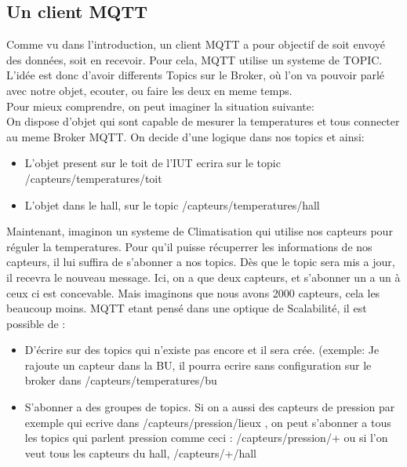 \documentclass[a4paper,10pt]{article}
\begin{document}
\subsection{Un client MQTT}
 Comme vu dans l'introduction, un client MQTT a pour objectif de soit envoyé des données, soit en recevoir. Pour cela, MQTT utilise un systeme de TOPIC. L'idée est donc d'avoir differents Topics sur le Broker, où l'on va pouvoir parlé avec notre objet, ecouter, ou faire les deux en meme temps.\\
 Pour mieux comprendre, on peut imaginer la situation suivante:\\
 On dispose d'objet qui sont capable de mesurer la temperatures et tous connecter au meme Broker MQTT.
 On decide d'une logique dans nos topics et ainsi:
 \begin{itemize}
  \item L'objet present sur le toit de l'IUT ecrira sur le topic /capteurs/temperatures/toit
  \item L'objet dans le hall, sur le topic /capteurs/temperatures/hall
 \end{itemize}
Maintenant, imaginon un systeme de Climatisation qui utilise nos capteurs pour réguler la temperatures. Pour qu'il puisse récuperrer les informations de nos capteurs, il lui suffira de s'abonner a nos topics. Dès que le topic sera mis a jour, il recevra le nouveau message.
Ici, on a que deux capteurs, et s'abonner un a un à ceux ci est concevable. Mais imaginons que nous avons 2000 capteurs, cela les beaucoup moins. MQTT etant pensé dans une optique de Scalabilité, il est possible de :
\begin{itemize}
 \item D'écrire sur des topics qui n'existe pas encore et il sera crée. (exemple: Je rajoute un capteur dans la BU, il pourra ecrire sans configuration sur le broker dans /capteurs/temperatures/bu
 \item S'abonner a des groupes de topics. Si on a aussi des capteurs de pression par exemple qui ecrive dans /capteurs/pression/lieux , on peut s'abonner a tous les topics qui parlent pression comme ceci : /capteurs/pression/+ ou si l'on veut tous les capteurs du hall, /capteurs/+/hall
 
\end{itemize}
\end{document}
